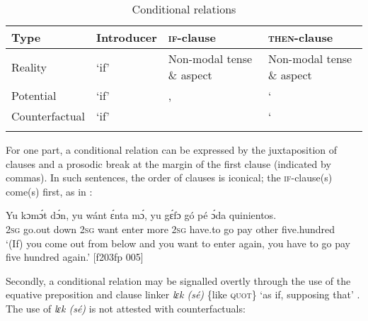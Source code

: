 \begin{table}
\caption{Conditional relations}
\label{tab:key:10.5}

\begin{tabularx}{\textwidth}{llQQ}
\lsptoprule

Type & Introducer & \textsc{if-}clause & \textsc{then-}clause\\
\midrule
Reality &  ‘if’ & Non-modal tense \& aspect & Non-modal tense \& aspect\\
Potential &  ‘if’ &  ,\newline  {}    &  ‘ \\
Counterfactual &  ‘if’ &   &  ‘\\
\lspbottomrule
\end{tabularx}
\end{table}
For one part, a conditional relation can be expressed by the juxtaposition of clauses and a prosodic break at the margin of the first clause (indicated by commas). In such sentences, the order of clauses is iconical; the \textsc{if-}clause(s) come(s) first, as in :


\ea%
    \label{ex:key:1520}
    \gll Yu  kɔmɔ́t  dɔ́n,    yu  wánt  ɛ́nta    mɔ́,    yu  gɛ́fɔ    gó  pé
ɔ́da    quinientos.\\
\textsc{2sg}  go.out  down  \textsc{2sg}  want  enter  more  \textsc{2sg}  have.to  go  pay
other  five.hundred\\

\glt ‘(If) you come out from below and you want to enter again, you have to 
go pay five hundred again.’ [f203fp 005]
\z

Secondly, a conditional relation may be signalled overtly through the use of the equative preposition and clause linker \textit{lɛk (sé)} \{like \textsc{quot}\} ‘as if, supposing that’ . The use of \textit{lɛk (sé)} is not attested with counterfactuals:


